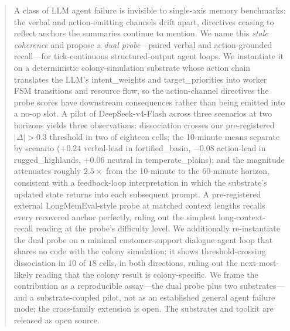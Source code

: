 \begin{abstract}
\noindent
A class of LLM agent failure is invisible to single-axis memory
benchmarks: the verbal and action-emitting channels drift apart,
directives ceasing to reflect anchors the summaries continue to
mention. We name this \emph{stale coherence} and propose a
\emph{dual probe}---paired verbal and action-grounded recall---for
tick-continuous structured-output agent loops. We instantiate it
on a deterministic colony-simulation substrate whose action chain
translates the LLM's \textsf{intent\_weights} and
\textsf{target\_priorities} into worker FSM transitions and
resource flow, so the action-channel directives the probe scores
have downstream consequences rather than being emitted into a
no-op slot. A pilot of DeepSeek-v4-Flash across three scenarios at two
horizons yields three observations: dissociation crosses our
pre-registered $|\Delta| > 0.3$ threshold in two of eighteen
cells; the 10-minute means separate by scenario
(${+}0.24$ verbal-lead in \textsf{fortified\_basin}, ${-}0.08$
action-lead in \textsf{rugged\_highlands},
${+}0.06$ neutral in \textsf{temperate\_plains}); and the
magnitude attenuates roughly $2.5\times$ from the 10-minute to the
60-minute horizon, consistent with a feedback-loop interpretation
in which the substrate's updated state returns into each
subsequent prompt. A pre-registered external
LongMemEval-style probe at matched context lengths recalls every
recovered anchor perfectly, ruling out the simplest long-context-
recall reading at the probe's difficulty level. We additionally
re-instantiate the dual probe on a minimal customer-support
dialogue agent loop that shares no code with the colony
simulation: it shows threshold-crossing dissociation in $10$ of
$18$ cells, in both directions, ruling out the next-most-likely
reading that the colony result is colony-specific. We frame the
contribution as a reproducible assay---the dual probe plus two
substrates---and a substrate-coupled pilot, not as an
established general agent failure mode; the cross-family
extension is open. The substrates and toolkit are released as
open source.
\end{abstract}
